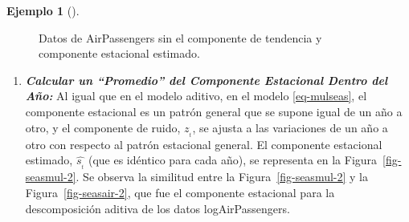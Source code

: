 \documentclass[
  us-letterpaper,
]{scrreprt}
\theoremstyle{plain}
\theoremstyle{definition}
\theoremstyle{definition}
\newtheorem{example}{Ejemplo}[chapter]
\theoremstyle{plain}
\theoremstyle{remark}
\begin{document}
\begin{example}[]
\begin{tcolorbox}
\begin{figure}[H]
\begin{minipage}{0.50\linewidth}
{}


\end{minipage}%
%
\begin{minipage}{0.50\linewidth}



\end{minipage}%

\caption{\label{fig-seasmul}Datos de AirPassengers sin el componente de
tendencia y componente estacional estimado.}

\end{figure}%

\begin{enumerate}
\def\labelenumi{\alph{enumi}.}
\setcounter{enumi}{2}
\item
  \textbf{\emph{Calcular un ``Promedio'' del Componente Estacional
  Dentro del Año:}} Al igual que en el modelo aditivo, en el modelo
  \ref{eq-mulseas}, el componente estacional es un patrón general que se
  supone igual de un año a otro, y el componente de ruido, \(z_{_t}\),
  se ajusta a las variaciones de un año a otro con respecto al patrón
  estacional general. El componente estacional estimado,
  \(\hat{s_{_t}}\) (que es idéntico para cada año), se representa en la
  Figura~\ref{fig-seasmul-2}. Se observa la similitud entre la
  Figura~\ref{fig-seasmul-2} y la Figura~\ref{fig-seasair-2}, que fue el
  componente estacional para la descomposición aditiva de los datos
  logAirPassengers.


\end{enumerate}
\end{tcolorbox}
\end{example}
\end{document}
